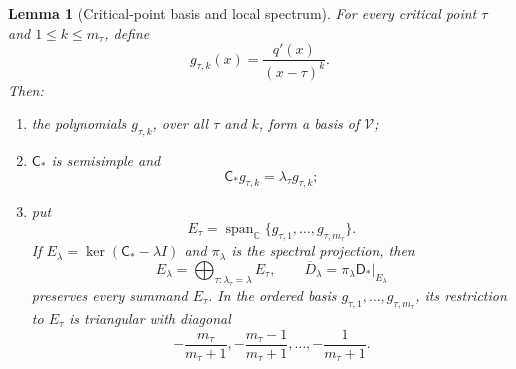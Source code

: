 \documentclass[11pt]{article}
\numberwithin{equation}{section}
\newtheorem{lemma}[lemma]{Lemma}
\theoremstyle{definition}
\theoremstyle{remark}
\newcommand{\C}{\mathbb C}
\newcommand{\Span}{\operatorname{span}}
\newcommand{\Vcal}{\mathscr V}
\begin{document}
\begin{lemma}[Critical-point basis and local spectrum]
\label{lem:critical-basis}
For every critical point $\tau$ and $1\le k\le m_\tau$, define
\begin{equation}\label{eq:g-tau-k}
  g_{\tau,k}(x)=\frac{q'(x)}{(x-\tau)^k}.
\end{equation}
Then:
\begin{enumerate}[label=\textup{(\roman*)},leftmargin=2.2em]
\item the polynomials $g_{\tau,k}$, over all $\tau$ and $k$, form a basis of
$\Vcal$;
\item $\mathsf C_*$ is semisimple and
\[
  \mathsf C_*g_{\tau,k}=\lambda_\tau g_{\tau,k};
\]
\item put
\[
  E_\tau=\Span_\C\{g_{\tau,1},\ldots,g_{\tau,m_\tau}\}.
\]
If $E_\lambda=\ker(\mathsf C_*-\lambda I)$ and $\pi_\lambda$ is the spectral
projection, then
\[
  E_\lambda=\bigoplus_{\tau:\lambda_\tau=\lambda}E_\tau,
  \qquad
  \overline D_\lambda
  =\pi_\lambda\mathsf D_*|_{E_\lambda}
\]
preserves every summand $E_\tau$.  In the ordered basis
$g_{\tau,1},\ldots,g_{\tau,m_\tau}$, its restriction to $E_\tau$ is
triangular with diagonal
\begin{equation}\label{eq:local-D-spectrum}
  -\frac{m_\tau}{m_\tau+1},
  -\frac{m_\tau-1}{m_\tau+1},
  \ldots,
  -\frac1{m_\tau+1}.
\end{equation}
\end{enumerate}
\end{lemma}
\end{document}
